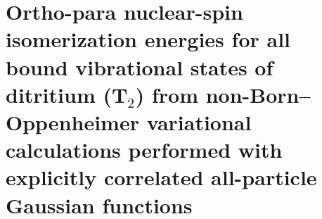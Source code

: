 \chapter[Ortho-para nuclear-spin isomerization energies for all bound vibrational states of ditritium (T$_2$) from non-Born–Oppenheimer variational calculations]{Ortho-para nuclear-spin isomerization energies for all bound vibrational states of ditritium (T$_2$) from non-Born–Oppenheimer variational calculations performed with explicitly correlated all-particle Gaussian functions\label{apndx13}}



